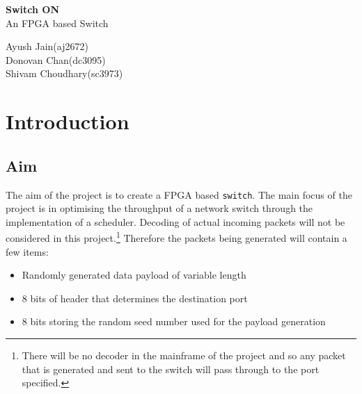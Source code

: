 \documentclass[twoside,12pt,fleqn]{book} %
\begin{document}

\begingroup
\thispagestyle{empty}
\centering
\vspace*{5cm}
\par\normalfont\fontsize{35}{35}\sffamily\selectfont
\textbf{Switch ON}\\
{\LARGE An FPGA based Switch}\par %
\vspace*{1cm}
{\Huge Ayush Jain(aj2672)\\ Donovan Chan(dc3095)\\ Shivam Choudhary(sc3973)}\par %
\endgroup

\newpage
\let\cleardoublepage\clearpage
{} %

\pagestyle{empty} %

\tableofcontents %
\pagestyle{fancy} %


\chapter{Introduction}

\section{Aim} 
\justify

The aim of the project is to create a FPGA based \texttt {switch}. The main focus of the project is in optimising the throughput of a network switch through the implementation of a scheduler. Decoding of actual incoming packets will not be considered in this project.\footnote{There will be no decoder in the mainframe of the project and so any packet that is generated and sent to the switch will pass through to the port specified.} Therefore the packets being generated will contain a few items: 
\begin{itemize}
    \item Randomly generated data payload of variable length
    \item 8 bits of header that determines the destination port
    \item 8 bits storing the random seed number used for the payload generation 
\end{itemize}
\end{document}
